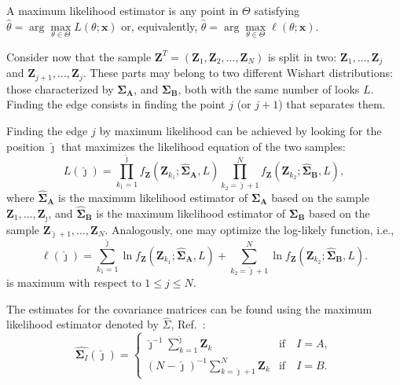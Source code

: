 \documentclass[conference]{IEEEtran}
\begin{document}
A maximum likelihood estimator is any point in $\Theta$ satisfying $\widehat{\theta}= \arg\max\limits_{\theta\in\Theta}L(\theta;\mathbf{x})$ or, equivalently, $\widehat{\theta}= \arg\max\limits_{\theta\in\Theta}\ell(\theta;\mathbf{x})$.

Consider now that the sample $\mathbf{Z}^T=(\mathbf{Z}_1,\mathbf{Z}_2,\dots,\mathbf{Z}_N)$ is split in two: $\mathbf{Z}_1,\dots,\mathbf{Z}_j$ and $\mathbf{Z}_{j+1},\dots,\mathbf{Z}_j$.
These parts may belong to two different Wishart distributions: those characterized by  $\mathbf{\Sigma_A}$, and $\mathbf{\Sigma_B}$, both with the same number of looks $L$.
Finding the edge consists in finding the point $j$ (or $j+1$) that separates them.

Finding the edge $j$ by maximum likelihood can be achieved by looking for the position $\widehat\jmath$ that maximizes the likelihood equation of the two samples:
%
\begin{equation}
	L(\widehat\jmath)=\prod_{k_1=1}^{\widehat\jmath}f_{\mathbf{Z}}(\mathbf{Z}_{k_1};\mathbf{\widehat\Sigma_{A}},L) \prod_{k_2=\widehat\jmath+1}^{N}f_{\mathbf{Z}}(\mathbf{Z}_{k_2};\mathbf{\widehat\Sigma_{B}},L),
	\label{eq_06}
\end{equation}
where $\mathbf{\widehat\Sigma_{A}}$ is the maximum likelihood estimator of $\mathbf{\Sigma_{A}}$ based on the sample $\mathbf{Z}_1,\dots,\mathbf{Z}_{\widehat\jmath}$, 
and $\mathbf{\widehat\Sigma_{B}}$ is the maximum likelihood estimator of $\mathbf{\Sigma_{B}}$ based on the sample $\mathbf{Z}_{\widehat\jmath+1},\dots,\mathbf{Z}_{N}$.
Analogously, one may optimize the log-likely function, i.e.,
\begin{equation}
\ell(\widehat\jmath) =
	\sum_{k_1=1}^{\widehat\jmath}\ln f_{\mathbf{Z}}(\mathbf{Z}_{k_1}; \mathbf{\widehat\Sigma_{A}},L) + \sum_{k_2=\widehat\jmath+1}^{N}\ln f_{\mathbf{Z}}(\mathbf{Z}_{k_2};     \mathbf{\widehat\Sigma_{B}},L).
	\label{eq_07}
\end{equation}
is maximum with respect to $1\leq j\leq N$.

The estimates for the covariance matrices can be found using the maximum likelihood estimator denoted by $\widehat{\Sigma}$, Ref.~\cite{good}: 
\begin{equation}
\widehat{\mathbf\Sigma_{I}}(\widehat\jmath) = \left\{
\begin{array}{lc}
	\widehat\jmath^{-1}\sum_{k=1}^{\widehat\jmath}\mathbf{Z}_{k}  & \mbox{if}\quad I=A,  \\
        (N-\widehat\jmath)^{-1}\sum_{k=\widehat\jmath+1}^{N}\mathbf{Z}_{k} & \mbox{if}\quad I=B.
\end{array}
\right.\label{eq_08}
\end{equation}
\end{document}
